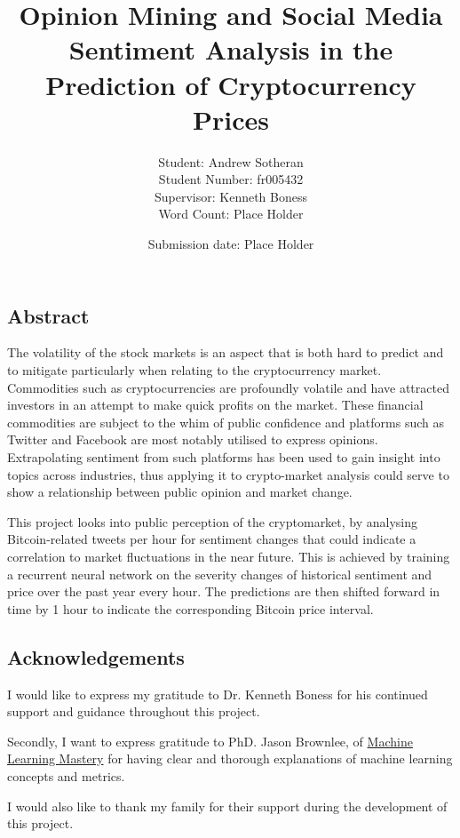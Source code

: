 \documentclass[oneside, 12pt]{article}
\title{Opinion Mining and Social Media Sentiment Analysis in the Prediction of Cryptocurrency Prices}
\date{Submission date: Place Holder}
\author{Student: Andrew Sotheran
	\\Student Number: fr005432
	\\Supervisor: Kenneth Boness
	\\Word Count: Place Holder}
\begin{document}
	
	\maketitle
	
	\vspace*{\fill}
	\begin{center}
		\section{Abstract}\label{abstract}
	\end{center}
		The volatility of the stock markets is an aspect that is both hard to predict and to mitigate particularly when relating to the cryptocurrency market. Commodities such as cryptocurrencies are profoundly volatile and have attracted investors in an attempt to make quick profits on the market. These financial commodities are subject to the whim of public confidence and platforms such as Twitter and Facebook are most notably utilised to express opinions. Extrapolating sentiment from such platforms has been used to gain insight into topics across industries, thus applying it to crypto-market analysis could serve to show a relationship between public opinion and market change. 
		
		This project looks into public perception of the cryptomarket, by analysing Bitcoin-related tweets per hour for sentiment changes that could indicate a correlation to market fluctuations in the near future. This is achieved by training a recurrent neural network on the severity changes of historical sentiment and price over the past year every hour. The predictions are then shifted forward in time by 1 hour to indicate the corresponding Bitcoin price interval.

	
	\newpage
	\begin{center}
		\section{Acknowledgements}\label{acknowledgements}
		I would like to express my gratitude to Dr. Kenneth Boness for his continued support and guidance throughout this project.  
		
		Secondly, I want to express gratitude to PhD. Jason Brownlee, of \href{machinelearningmastery.com}{Machine Learning Mastery} for having clear and thorough explanations of machine learning concepts and metrics.
		
		I would also like to thank my family for their support during the development of this project.
		
	\end{center}
	
\end{document}
